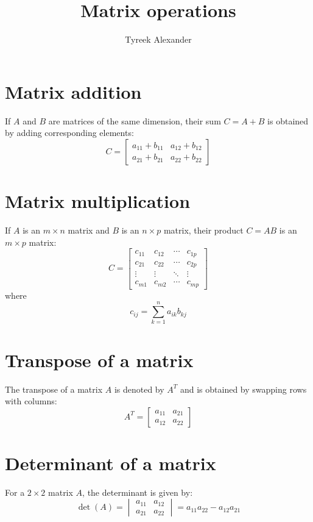 \documentclass{article}
\begin{document}
\title{Matrix operations}
\author{Tyreek Alexander}
\maketitle

\section{Matrix addition}
If $A$ and $B$ are matrices of the same dimension, their sum $C = A + B$ is obtained by adding corresponding elements:
\[
C = \begin{bmatrix}
a_{11} + b_{11} & a_{12} + b_{12} \\
a_{21} + b_{21} & a_{22} + b_{22}
\end{bmatrix}
\]

\section{Matrix multiplication}
If $A$ is an $m \times n$ matrix and $B$ is an $n \times p$ matrix, their product $C = AB$ is an $m \times p$ matrix:
\[
C = \begin{bmatrix}
c_{11} & c_{12} & \cdots & c_{1p} \\
c_{21} & c_{22} & \cdots & c_{2p} \\
\vdots & \vdots & \ddots & \vdots \\
c_{m1} & c_{m2} & \cdots & c_{mp}
\end{bmatrix}
\]
where
\[
c_{ij} = \sum_{k=1}^{n} a_{ik} b_{kj}
\]

\section{Transpose of a matrix}
The transpose of a matrix $A$ is denoted by $A^T$ and is obtained by swapping rows with columns:
\[
A^T = \begin{bmatrix}
a_{11} & a_{21} \\
a_{12} & a_{22}
\end{bmatrix}
\]

\section{Determinant of a matrix}
For a $2 \times 2$ matrix $A$, the determinant is given by:
\[
\det(A) = \begin{vmatrix}
a_{11} & a_{12} \\
a_{21} & a_{22}
\end{vmatrix} = a_{11}a_{22} - a_{12}a_{21}
\]
\end{document}
